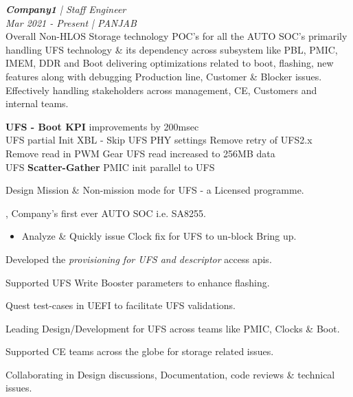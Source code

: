 {\large{\textit{\textbf{Company1} | Staff Engineer}}}\\
{\small{\textit{Mar 2021 - Present | PANJAB}}} \\
\scriptsize{Overall Non-HLOS Storage technology POC's for all the AUTO SOC's primarily handling UFS technology \& its dependency across subsystem like PBL, PMIC, IMEM, DDR and Boot \textendash{} delivering optimizations related to boot, flashing, new features along with debugging Production line, Customer \& Blocker issues. \\
Effectively handling stakeholders across management, CE, Customers and internal teams.%
}
\begin{itemize}
\footnotesize {
   \item \noindent \textbf{UFS - Boot KPI} improvements \textemdash{} by 200msec \\
      \textbullet UFS partial Init               \textbullet XBL - Skip UFS PHY settings    \textbullet Remove retry of UFS2.x \\
      \textbullet Remove read in PWM Gear        \textbullet UFS read increased to 256MB data   \\
      \textbullet UFS \textbf{Scatter-Gather}    \textbullet PMIC init parallel to UFS
      \item \noindent Design Mission \& Non-mission mode for UFS - a Licensed programme.
      \item {}, Company's first ever AUTO SOC i.e. SA8255.
%
      \begin{itemize}
      \item \noindent Analyze \& Quickly issue Clock fix for UFS to un-block Bring up.
      \end{itemize}
%
      \item \noindent Developed the \textit{provisioning for UFS and descriptor} access apis.
      \item \noindent Supported UFS Write Booster parameters to enhance flashing.
      \item \noindent Quest test-cases in UEFI to facilitate UFS validations.
      \item \noindent Leading Design/Development for UFS across teams like PMIC, Clocks \& Boot.
      \item \noindent Supported CE teams across the globe for storage related issues.
      \item \noindent Collaborating in Design discussions, Documentation, code reviews \& technical issues.
}
\end{itemize}


